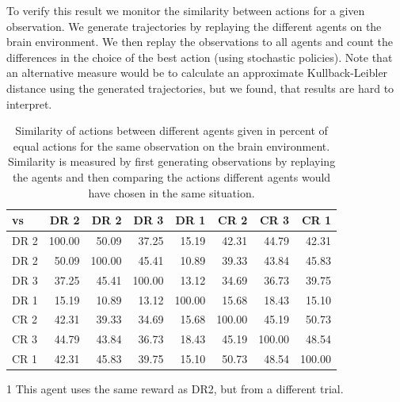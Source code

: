 To verify this result we monitor the similarity between actions for a given observation. We generate trajectories by replaying the different agents on the brain environment. We then replay the observations to all agents and count the differences in the choice of the best action (using stochastic policies). Note that an alternative measure would be to calculate an approximate Kullback-Leibler distance using the generated trajectories, but we found, that results are hard to interpret.

\begin{table}[htp]
    \begin{center}
        \begin{threeparttable}
            \begin{tabular}{l|rrrrrrr}
                \toprule
                vs & DR 2 & DR 2\tnote{1} & DR 3 & DR 1 & CR 2 & CR 3 & CR 1 \\
                \midrule
                DR 2 & 100.00 & 50.09 & 37.25 & 15.19 & 42.31 & 44.79 & 42.31 \\
                DR 2\tnote{1} & 50.09 & 100.00 & 45.41 & 10.89 & 39.33 & 43.84 & 45.83 \\
                DR 3 & 37.25 & 45.41 & 100.00 & 13.12 & 34.69 & 36.73 & 39.75 \\
                DR 1 & 15.19 & 10.89 & 13.12 & 100.00 & 15.68 & 18.43 & 15.10 \\
                CR 2 & 42.31 & 39.33 & 34.69 & 15.68 & 100.00 & 45.19 & 50.73 \\
                CR 3 & 44.79 & 43.84 & 36.73 & 18.43 & 45.19 & 100.00 & 48.54 \\
                CR 1 & 42.31 & 45.83 & 39.75 & 15.10 & 50.73 & 48.54 & 100.00 \\
                \bottomrule
            \end{tabular}
            \begin{tablenotes} \footnotesize
                \item[1] This agent uses the same reward as DR2, but from a different trial.
            \end{tablenotes}
        \end{threeparttable}
    \end{center}
    \caption[Agent Action Similarity for Different Rewards]{Similarity of actions between different agents given in percent of equal actions for the same observation on the brain environment. Similarity is measured by first generating observations by replaying the agents and then comparing the actions different agents would have chosen in the same situation.} \label{tab:Maze0122/Reward/Similarity}
\end{table}

